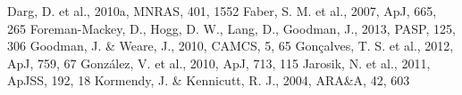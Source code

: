 \documentclass{mn2e}
\begin{document}
\begin{thebibliography}{}
 Darg, D. et al., 2010a, MNRAS, 401, 1552
 Faber, S. M. et al., 2007, ApJ, 665, 265
 Foreman-Mackey, D., Hogg, D. W., Lang, D., Goodman, J., 2013, PASP, 125, 306
 Goodman, J. \& Weare, J., 2010, CAMCS, 5, 65
 Gon\c calves, T. S. et al., 2012, ApJ, 759, 67
 Gonz\'alez, V. et al., 2010, ApJ, 713, 115
 Jarosik, N. et al., 2011, ApJSS, 192, 18
 Kormendy, J. \& Kennicutt, R. J., 2004, ARA\&A, 42, 603

\end{thebibliography}
\end{document}
